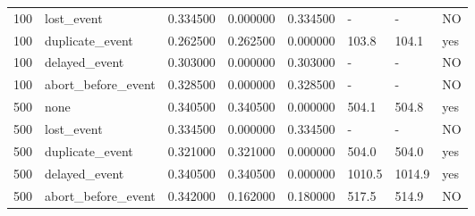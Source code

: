 \begin{table}[t]
{\begin{tabular}{llllllll}
100 & lost\_event & 0.334500 & 0.000000 & 0.334500 & - & - & NO \\
100 & duplicate\_event & 0.262500 & 0.262500 & 0.000000 & 103.8 & 104.1 & yes \\
100 & delayed\_event & 0.303000 & 0.000000 & 0.303000 & - & - & NO \\
100 & abort\_before\_event & 0.328500 & 0.000000 & 0.328500 & - & - & NO \\
500 & none & 0.340500 & 0.340500 & 0.000000 & 504.1 & 504.8 & yes \\
500 & lost\_event & 0.334500 & 0.000000 & 0.334500 & - & - & NO \\
500 & duplicate\_event & 0.321000 & 0.321000 & 0.000000 & 504.0 & 504.0 & yes \\
500 & delayed\_event & 0.340500 & 0.340500 & 0.000000 & 1010.5 & 1014.9 & yes \\
500 & abort\_before\_event & 0.342000 & 0.162000 & 0.180000 & 517.5 & 514.9 & NO \\
\bottomrule
\end{tabular}}
\end{table}
